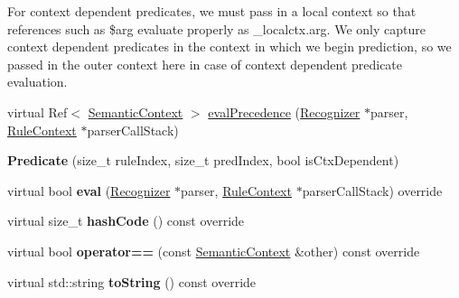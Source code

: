 \begin{DoxyCompactItemize}
\begin{DoxyCompactList}
For context dependent predicates, we must pass in a local context so that references such as \$arg evaluate properly as \+\_\+localctx.\+arg. We only capture context dependent predicates in the context in which we begin prediction, so we passed in the outer context here in case of context dependent predicate evaluation. \end{DoxyCompactList}\item 
virtual Ref$<$ \hyperlink{classantlr4_1_1atn_1_1SemanticContext}{Semantic\+Context} $>$ \hyperlink{classantlr4_1_1atn_1_1SemanticContext_a09cae49496728bdd0aa3147ffdc152cb}{eval\+Precedence} (\hyperlink{classantlr4_1_1Recognizer}{Recognizer} $\ast$parser, \hyperlink{classantlr4_1_1RuleContext}{Rule\+Context} $\ast$parser\+Call\+Stack)
\item 
\mbox{\label{classantlr4_1_1atn_1_1SemanticContext_ac9cc627e265603c153838f62b56f3e99}} 
{\bfseries Predicate} (size\+\_\+t rule\+Index, size\+\_\+t pred\+Index, bool is\+Ctx\+Dependent)
\item 
\mbox{\label{classantlr4_1_1atn_1_1SemanticContext_aaf020c5b73a8d0216f8423acd5d4cea8}} 
virtual bool {\bfseries eval} (\hyperlink{classantlr4_1_1Recognizer}{Recognizer} $\ast$parser, \hyperlink{classantlr4_1_1RuleContext}{Rule\+Context} $\ast$parser\+Call\+Stack) override
\item 
\mbox{\label{classantlr4_1_1atn_1_1SemanticContext_a82a09a52cfc8030b1c33f1eaadad539a}} 
virtual size\+\_\+t {\bfseries hash\+Code} () const override
\item 
\mbox{\label{classantlr4_1_1atn_1_1SemanticContext_a1400e1ca84faec671a3756ff0b9f4734}} 
virtual bool {\bfseries operator==} (const \hyperlink{classantlr4_1_1atn_1_1SemanticContext}{Semantic\+Context} \&other) const override
\item 
\mbox{\label{classantlr4_1_1atn_1_1SemanticContext_a2a712638848af9bc2c996bda844eb15b}} 
virtual std\+::string {\bfseries to\+String} () const override
\item 
\mbox{\label{classantlr4_1_1atn_1_1SemanticContext_a4f10c58d91b681e4346cbd000b6c48b3}} 

\end{DoxyCompactItemize}
